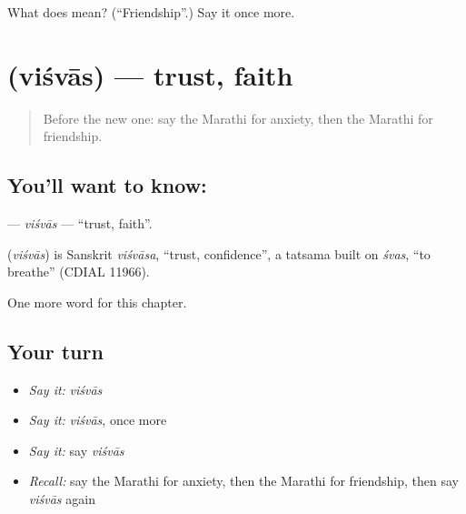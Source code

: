 \begin{tcolorbox}[breakable,colback=teal!4,colframe=teal!35!black,title={Before you move on}]
What does  mean? (\textquotedblleft{}Friendship\textquotedblright{}.) Say it once more.
\end{tcolorbox}
\section[\texorpdfstring{\mr{विश्वास} (viśvās)}{विश्वास (viśvās)}]{ (viśvās) — trust, faith}

\label{lesson:MR-C257-visvas}



\begin{quote}
Before the new one: say the Marathi for anxiety, then the Marathi for friendship.
\end{quote}

\subsection*{You'll want to know: }
\textbf{} — \emph{viśvās} — \textquotedblleft{}trust, faith\textquotedblright{}.

\begin{cousinweb}
\textbf{} (\emph{viśvās}) is Sanskrit \emph{viśvāsa}, \textquotedblleft{}trust, confidence\textquotedblright{}, a tatsama built on \emph{śvas}, \textquotedblleft{}to breathe\textquotedblright{} (CDIAL 11966).
\end{cousinweb}

\begin{grammarlens}[title={What you've built}]
One more word for this chapter.
\end{grammarlens}

\subsection*{Your turn}
\begin{itemize}
\raggedright
  \item \emph{Say it:} \emph{viśvās}
  \item \emph{Say it:} \emph{viśvās}, once more
  \item \emph{Say it:} say \emph{viśvās}
  \item \emph{Recall:} say the Marathi for anxiety, then the Marathi for friendship, then say \emph{viśvās} again
\end{itemize}

